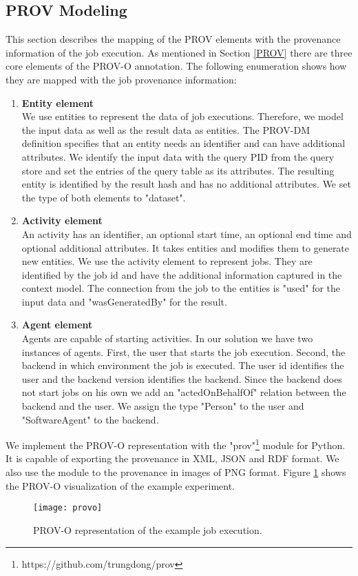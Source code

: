 \documentclass[draft,final]{vutinfth} %
\newcommand{\bgoesswein}[1]{{\color{blue}#1}}
\begin{document}
\bgoesswein{
\subsection{PROV Modeling}\label{Implementation:PROV-O}

This section describes the mapping of the PROV elements with the provenance information of the job execution. As mentioned in Section \ref{PROV} there are three core elements of the PROV-O annotation. The following enumeration shows how they are mapped with the job provenance information:

\begin{enumerate}
	\item \textbf{Entity element} \\
	We use entities to represent the data of job executions. Therefore, we model the input data as well as the result data as entities. The PROV-DM definition specifies that an entity needs an identifier and can have additional attributes. We identify the input data with the query PID from the query store and set the entries of the query table as its attributes. The resulting entity is identified by the result hash and has no additional attributes. We set the type of both elements to "dataset".
	\item \textbf{Activity element} \\  
	An activity has an identifier, an optional start time, an optional end time and optional additional attributes. It takes entities and modifies them to generate new entities. We use the activity element to represent jobs. They are identified by the job id and have the additional information captured in the context model. The connection from the job to the entities is "used" for the input data and "wasGeneratedBy" for the result.
	\item \textbf{Agent element} \\
	Agents are capable of starting activities. In our solution we have two instances of agents. First, the user that starts the job execution. Second, the backend in which environment the job is executed. The user id identifies the user and the backend version identifies the backend. Since the backend does not start jobs on his own we add an "actedOnBehalfOf" relation between the backend and the user. We assign the type "Person" to the user and "SoftwareAgent" to the backend.    
\end{enumerate}

We implement the PROV-O representation with the "prov"\footnote{https://github.com/trungdong/prov} module for Python. It is capable of exporting the provenance in XML, JSON and RDF format. We also use the module to  the provenance in images of PNG format. Figure \ref{fig:impl_provo} shows the PROV-O visualization of the example experiment. 
}
\begin{figure}[h]
	\centering
	\texttt{[image: provo]}
	\caption{PROV-O representation of the example job execution.}
	\label{fig:impl_provo} %
\end{figure}
\newpage
\end{document}
